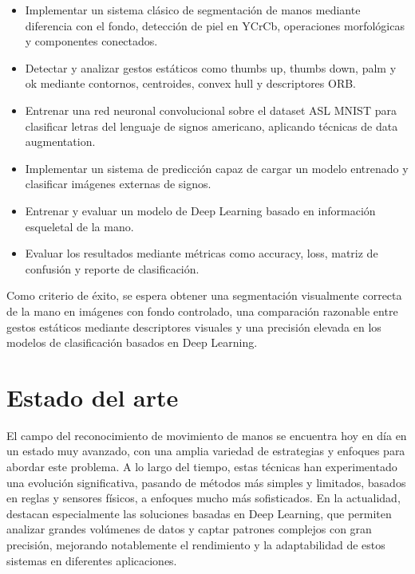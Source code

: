 \documentclass[10pt,a4paper,twocolumn,twoside]{article}
\begin{document}
\begin{itemize}
\item Implementar un sistema clásico de segmentación de manos mediante diferencia con el fondo, detección de piel en YCrCb, operaciones morfológicas y componentes conectados.

\item Detectar y analizar gestos estáticos como thumbs up, thumbs down, palm y ok mediante contornos, centroides, convex hull y descriptores ORB.

\item Entrenar una red neuronal convolucional sobre el dataset ASL MNIST para clasificar letras del lenguaje de signos americano, aplicando técnicas de data augmentation.

\item Implementar un sistema de predicción capaz de cargar un modelo entrenado y clasificar imágenes externas de signos.

\item Entrenar y evaluar un modelo de Deep Learning basado en información esqueletal de la mano.

\item Evaluar los resultados mediante métricas como accuracy, loss, matriz de confusión y reporte de clasificación.
\end{itemize}

Como criterio de éxito, se espera obtener una segmentación visualmente correcta de la mano en imágenes con fondo controlado, una comparación razonable entre gestos estáticos mediante descriptores visuales y una precisión elevada en los modelos de clasificación basados en Deep Learning.
\section{Estado del arte}

El campo del reconocimiento de movimiento de manos se encuentra hoy en día en un estado muy avanzado, con una amplia variedad de estrategias y enfoques para abordar este problema. A lo largo del tiempo, estas técnicas han experimentado una evolución significativa, pasando de métodos más simples y limitados, basados en reglas y sensores físicos, a enfoques mucho más sofisticados. En la actualidad, destacan especialmente las soluciones basadas en Deep Learning, que permiten analizar grandes volúmenes de datos y captar patrones complejos con gran precisión, mejorando notablemente el rendimiento y la adaptabilidad de estos sistemas en diferentes aplicaciones. 
\end{document}
